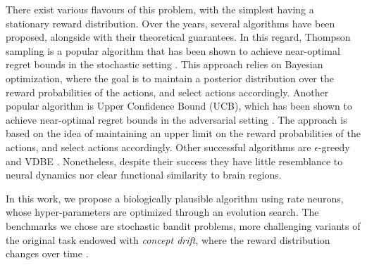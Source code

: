 There exist various flavours of this problem, with the simplest having a stationary reward distribution.
Over the years, several algorithms have been proposed, alongside with their theoretical guarantees.
In this regard, Thompson sampling is a popular algorithm that has been shown to achieve near-optimal regret bounds in the stochastic setting \cite{agrawalAnalysisThompsonSampling2012, kaufmannThompsonSamplingAsymptotically2012}.
This approach relies on Bayesian optimization, where the goal is to maintain a posterior distribution over the reward probabilities of the actions, and select actions accordingly.
Another popular algorithm is Upper Confidence Bound (UCB), which has been shown to achieve near-optimal regret bounds in the adversarial setting \cite{auerFinitetimeAnalysisMultiarmed2002}.
The approach is based on the idea of maintaining an upper limit on the reward probabilities of the actions, and select actions accordingly.
Other successful algorithms are $\epsilon$-greedy and VDBE \cite{gittinsBanditProcessesDynamic1979, banMultifacetContextualBandits2021, tokicAdaptiveEGreedyExploration2010, tokicValueDifferenceBasedExploration2011}.
Nonetheless, despite their success they have little resemblance to neural dynamics nor clear functional similarity to brain regions.

In this work, we propose a biologically plausible algorithm using rate neurons, whose hyper-parameters are optimized through an evolution search. The benchmarks we chose are stochastic bandit problems, more challenging variants of the original task endowed with \textit{concept drift}, where the reward distribution changes over time \cite{garivierUpperConfidenceBoundPolicies2008, besbesStochasticMultiArmedBanditProblem2014, cavenaghiNonStationaryMultiArmed2021}.


